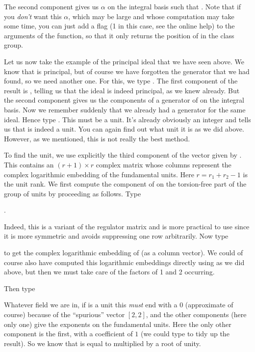 The second component  gives us $\alpha$ on the integral basis
such that . Note that if you {\it don't\/} want
this $\alpha$, which may be large and whose computation may take some time,
you can just add a flag (1 in this case, see the online help) to the
arguments of the  function, so that it only returns the
position of  in the class group. \smallskip

Let us now take the example of the principal ideal  that we have
seen above. We know that  is principal, but of course we have
forgotten the generator that we had found, so we need another one. For this,
we type . The first component of the result
is \kbd{[0]}, telling us that the ideal is indeed principal, as we knew
already. But the second component gives us the components of a generator of
 on the integral basis. Now we remember suddenly that we already had
a generator  for the same ideal. Hence type
. This must be a unit. It's already obviously an
integer and  tells us that  is indeed a unit.
You can again find out what unit it is as we did above. However, as we
mentioned, this is not really the best method.

To find the unit, we use explicitly the third component of the vector
 given by . This contains an $(r+1)\times r$ complex
matrix whose columns represent the complex logarithmic embedding of the
fundamental units. Here $r=r_1+r_2-1$ is the unit rank. We first compute
the component of  on the torsion-free part of the group of units
by proceeding as follows. Type

.

Indeed, this is a variant of the regulator matrix and is more practical to
use since it is more symmetric and avoids suppressing one row arbitrarily.
Now type


to get the complex logarithmic embedding of  (as a column vector). We
could of course also have computed this logarithmic embeddings directly using
 as we did above, but then we must take care of the factors of 1
and 2 occurring.

Then type 

Whatever field we are in, if  is a unit this {\it must} end with a 0
(approximate of course) because of the ``spurious'' vector $[2,2]$, and the
other components (here only one) give the exponents on the fundamental units.
Here the only other component is the first, with a coefficient of $1$ (we
could type  to tidy up the result). So we know that  is
equal to  multiplied by a root of unity.

